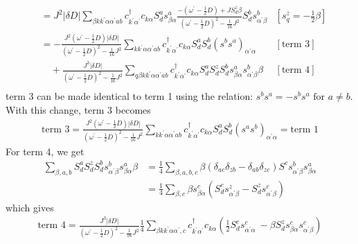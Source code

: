 \documentclass[12pt]{article}
\begin{document}
\begin{equation}
\begin{aligned}
							   &= J^2 |\delta D|\sum_{\beta k k^\prime \alpha \alpha^\prime a b} c^\dagger_{k^\prime\alpha^\prime}c_{k\alpha} S_d^a s^a_{\beta \alpha} \frac{-\left(\omega^\prime - \frac{1}{2}D\right) + J S_d^z \beta}{\left(\omega^\prime - \frac{1}{2}D\right)^2 - \frac{1}{16}J^2} S_d^b s^b_{\alpha^\prime \beta} & \left[s_q^z = -\frac{1}{2}\beta\right] \\
							   &= -\frac{J^2\left(\omega^\prime - \frac{1}{2}D\right)|\delta D|}{\left(\omega^\prime - \frac{1}{2}D\right)^2 - \frac{1}{16}J^2}\sum_{k k^\prime \alpha \alpha^\prime a b} c^\dagger_{k^\prime\alpha^\prime}c_{k\alpha} S_d^a  S_d^b \left(s^b s^a\right)_{\alpha^\prime \alpha} & \left[\text{term 3}\right] \\
							   &\quad+ \frac{J^3|\delta D|}{\left(\omega^\prime - \frac{1}{2}D\right)^2 - \frac{1}{16}J^2} \sum_{q\beta k k^\prime \alpha \alpha^\prime a b} c^\dagger_{k^\prime\alpha^\prime}c_{k\alpha} S_d^a S_d^z S_d^b s^a_{\beta \alpha} s^b_{\alpha^\prime \beta} \beta & \left[\text{term 4}\right] \\
\end{aligned}\end{equation}
term 3 can be made identical to term 1 using the relation: \(s^b s^a = -s^b s^a \text{ for } a \neq b\). With this change, term 3 becomes
\begin{equation}\begin{aligned}
	\text{term 3} = \frac{J^2\left(\omega^\prime - \frac{1}{2}D\right)|\delta D|}{\left(\omega^\prime - \frac{1}{2}D\right)^2 - \frac{1}{16}J^2}\sum_{k k^\prime \alpha \alpha^\prime a b} c^\dagger_{k^\prime\alpha^\prime}c_{k\alpha} S_d^a  S_d^b \left(s^a s^b\right)_{\alpha^\prime \alpha} = \text{term 1}
\end{aligned}\end{equation}
For term 4, we get
\begin{equation}\begin{aligned}
	\sum_{\beta,a,b} S_d^a S_d^z S_d^b s^b_{\alpha^\prime \beta} s^a_{\beta \alpha} \beta &= \frac{1}{4}\sum_{\beta,a,b,c}\beta\left(\delta_{ac}\delta_{zb} - \delta_{ab}\delta_{zc}\right) S^cs^b_{\alpha^\prime \beta} s^a_{\beta \alpha} \\
																&= \frac{1}{4}\sum_{\beta,c}\beta s^c_{\beta\alpha}\left(S^c_d s^z_{\alpha^\prime\beta} - S^z_d s^c_{\alpha^\prime\beta}\right)
\end{aligned}\end{equation}
which gives
\begin{equation}\begin{aligned}
	\text{term 4} = \frac{J^3|\delta D|}{\left(\omega^\prime - \frac{1}{2}D\right)^2 - \frac{1}{16}J^2} \frac{1}{4}\sum_{\beta k k^\prime \alpha \alpha^\prime,c} c^\dagger_{k^\prime\alpha^\prime} c_{k\alpha} \left(\frac{1}{2}S_d^c s^c_{\alpha^\prime\alpha}\ - \beta S_d^z s^c_{\beta\alpha}s^c_{\alpha^\prime\beta}\right)
\end{aligned}\end{equation}
\end{document}
